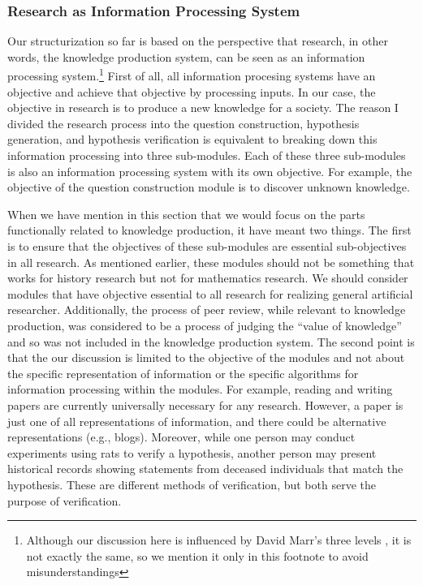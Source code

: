 \subsubsection{Research as Information Processing System}
Our structurization so far is based on the perspective that research, in other words, the knowledge production system, can be seen as an information processing system.\footnote{Although our discussion here is influenced by David Marr's three levels  \cite{marr2010vision}, it is not exactly the same, so we mention it only in this footnote to avoid misunderstandings} First of all, all information procesing systems have an objective and achieve that objective by processing inputs. In our case, the objective in research is to produce a new knowledge for a society. The reason I divided the research process into the question construction, hypothesis generation, and hypothesis verification is equivalent to breaking down this information processing into three sub-modules. Each of these three sub-modules is also an information processing system with its own objective. For example, the objective of the question construction module is to discover unknown knowledge.

When we have mention in this section that we would focus on the parts functionally related to knowledge production, it have meant two things. The first is to ensure that the objectives of these sub-modules are essential sub-objectives in all research. As mentioned earlier, these modules should not be something that works for history research but not for mathematics research. We should consider modules that have objective essential to all research for realizing general artificial researcher. Additionally, the process of peer review, while relevant to knowledge production, was considered to be a process of judging the ``value of knowledge'' and so was not included in the knowledge production system. The second point is that the our discussion is limited to the objective of the modules and not about the specific representation of information or the specific algorithms for information processing within the modules. For example, reading and writing papers are currently universally necessary for any research. However, a paper is just one of all representations of information, and there could be alternative representations (e.g., blogs). Moreover, while one person may conduct experiments using rats to verify a hypothesis, another person may present historical records showing statements from deceased individuals that match the hypothesis. These are different methods of verification, but both serve the purpose of verification.


